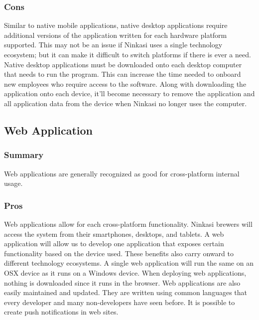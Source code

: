 \documentclass[draftclsnofoot,onecolumn,letterpaper,10pt,compsoc]{IEEEtran}
\begin{document}
		        \subsubsection{Cons}
		            Similar to native mobile applications, native desktop applications require additional versions of the application written for each hardware platform supported.
		            This may not be an issue if Ninkasi uses a single technology ecosystem; but it can make it difficult to switch platforms if there is ever a need.
		            Native desktop applications must be downloaded onto each desktop computer that needs to run the program.
		            This can increase the time needed to onboard new employees who require access to the software.
		            Along with downloading the application onto each device, it'll become necessary to remove the application and all application data from the device when Ninkasi no longer uses the computer.


			\subsection{Web Application}
		        \subsubsection{Summary}
		            Web applications are generally recognized as good for cross-platform internal usage\cite{SearchCloudOverview}.

		        \subsubsection{Pros}
		            Web applications allow for each cross-platform functionality.
		            Ninkasi brewers will access the system from their smartphones, desktops, and tablets.
		            A web application will allow us to develop one application that exposes certain functionality based on the device used.
		            These benefits also carry onward to different technology ecosystems.
		            A single web application will run the same on an OSX device as it runs on a Windows device.
		            When deploying web applications, nothing is downloaded since it runs in the browser.
		            Web applications are also easily maintained and updated.
		            They are written using common languages that every developer and many non-developers have seen before.
		            It is possible to create push notifications in web sites\cite{GooglePushNotifications}.
\end{document}
